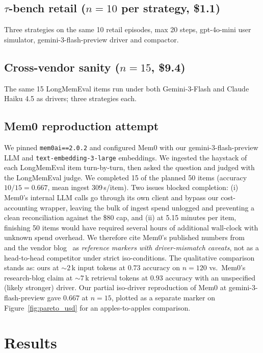 \documentclass{article}
\begin{document}
\subsection{$\tau$-bench retail ($n{=}10$ per strategy, \$1.1)}

Three strategies on the same 10 retail episodes, max 20 steps,
gpt-4o-mini user simulator, gemini-3-flash-preview driver and compactor.

\subsection{Cross-vendor sanity ($n{=}15$, \$9.4)}

The same 15 LongMemEval items run under both Gemini-3-Flash and
Claude Haiku 4.5 as drivers; three strategies each.

\subsection{Mem0 reproduction attempt}\label{sec:mem0}

We pinned \texttt{mem0ai==2.0.2} and configured Mem0 with our
gemini-3-flash-preview LLM and \texttt{text-embedding-3-large}
embeddings. We ingested the haystack of each LongMemEval item
turn-by-turn, then asked the question and judged with the LongMemEval
judge. We completed 15 of the planned 50 items (accuracy
$10/15 = 0.667$, mean ingest 309\,s/item). Two issues blocked completion:
(i) Mem0's internal LLM calls go through its own client and bypass our
cost-accounting wrapper, leaving the bulk of ingest spend unlogged and
preventing a clean reconciliation against the \$80 cap, and (ii) at
5.15 minutes per item, finishing 50 items would have required
several hours of additional wall-clock with unknown spend overhead.
We therefore cite Mem0's published numbers from~\citep{mem0_2025} and
the vendor blog~\citep{mem0_blog_2025} as \emph{reference markers with
driver-mismatch caveats}, not as a head-to-head competitor under
strict iso-conditions. The qualitative comparison stands as: ours at
$\sim\!2$\,k input tokens at $0.73$ accuracy on $n{=}120$ vs.\ Mem0's
research-blog claim at $\sim\!7$\,k retrieval tokens at $0.93$
accuracy with an unspecified (likely stronger) driver. Our partial
iso-driver reproduction of Mem0 at gemini-3-flash-preview gave
$0.667$ at $n{=}15$, plotted as a separate marker on
Figure~\ref{fig:pareto_usd} for an apples-to-apples comparison.

\section{Results}\label{sec:results}
\end{document}
